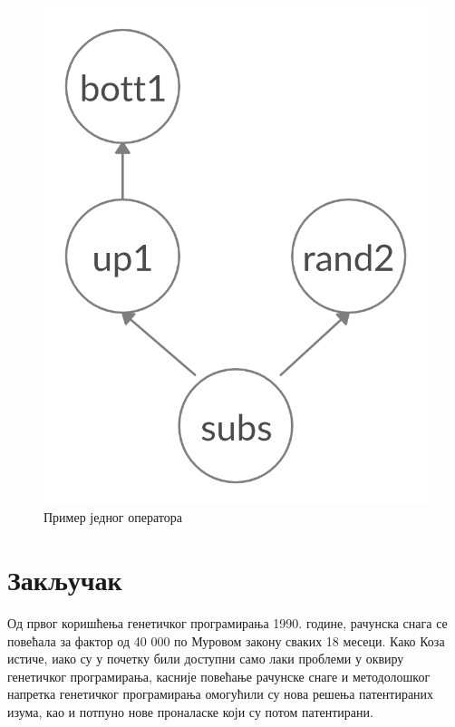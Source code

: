 \documentclass[a4paper]{article}
\begin{document}
\begin{figure}[ht!]
    \begin{center}
    \includegraphics[scale=0.12]{mgp_primer.png}
    \end{center}
    \caption{Пример једног оператора}
    \label{fig:mgp_primer}
\end{figure}

\section{Закључак}

Од првог коришћења генетичког програмирања 1990. године, рачунска снага се повећала за фактор од 40 000 по Муровом закону сваких 18 месеци. Како Коза истиче, иако су у почетку били доступни само лаки проблеми у оквиру генетичког програмирања, касније повећање рачунске снаге и методолошког напретка генетичког програмирања омогућили су нова решења патентираних изума, као и потпуно нове проналаске који су потом патентирани.
\end{document}
